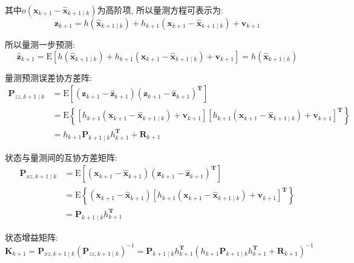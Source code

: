 \documentclass{article}
\begin{document}
其中$o\left(\mathbf{x}_{k+1}-\mathbf{\hat x}_{k+1 \mid k}\right)$为高阶项, 所以量测方程可表示为: 
\begin{equation*}
    \mathbf{z}_{k+1}=h\left(\hat{\mathbf{x}}_{k+1 \mid k}\right)+h_{k+1}\left(\mathbf{x}_{k+1}-\hat{\mathbf{x}}_{k+1 \mid k}\right)+\mathbf{v}_{k+1} 
\end{equation*}

所以量测一步预测:
\begin{equation*}
    \mathbf{\hat z}_{k+1}=\mathrm{E}\left[h\left(\hat{\mathbf{x}}_{k+1 \mid k}\right)+h_{k+1}\left(\mathbf{x}_{k+1}-\hat{\mathbf{x}}_{k+1 \mid k}\right)+\mathbf{v}_{k+1}\right]=h\left(\hat{\mathbf{x}}_{k+1 \mid k}\right)
\end{equation*}


量测预测误差协方差阵:
\begin{equation*}
    \begin{aligned}
    \mathbf{P}_{z z, k+1 \mid k} &=\mathrm{E}\left[\left(\mathbf{z}_{k+1}-\mathbf{\hat z}_{k+1}\right)\left(\mathbf{z}_{k+1}-\mathbf{\hat z}_{k+1}\right)^{\mathbf{T}}\right] \\
    &=\mathrm{E}\left\{\left[h_{k+1}\left(\mathbf{x}_{k+1}-\hat{\mathbf{x}}_{k+1 \mid k}\right)+\mathbf{v}_{k+1}\right]\left[h_{k+1}\left(\mathbf{x}_{k+1}-\hat{\mathbf{x}}_{k+1 \mid k}\right)+\mathbf{v}_{k+1}\right]^{\mathbf{T}}\right\} \\
    &=h_{k+1} \mathbf{P}_{k+1 \mid k} h_{k+1}^{\mathbf{T}}+\mathbf{R}_{k+1}
    \end{aligned}
\end{equation*}

状态与量测间的互协方差矩阵:
\begin{equation*}
    \begin{aligned}
    \mathbf{P}_{x z, k+1 \mid k} &=\mathrm{E}\left[\left(\mathbf{x}_{k+1}-\hat{\mathbf{x}}_{k+1}\right)\left(\mathbf{z}_{k+1}-\hat{\mathbf{z}}_{k+1}\right)^{\mathbf{T}}\right] \\
    &=\mathrm{E}\left\{\left(\mathbf{x}_{k+1}-\hat{\mathbf{x}}_{k+1}\right)\left[h_{k+1}\left(\mathbf{x}_{k+1}-\hat{\mathbf{x}}_{k+1 \mid k}\right)+\mathbf{v}_{k+1}\right]^{\mathbf{T}}\right\} \\
    &=\mathbf{P}_{k+1 \mid k} h_{k+1}^{\mathbf{T}}
    \end{aligned}
\end{equation*}

状态增益矩阵:
\begin{equation*}
    \mathbf{K}_{k+1}=\mathbf{P}_{x z, k+1 \mid k}\left(\mathbf{P}_{z z, k+1 \mid k}\right)^{-1}=\mathbf{P}_{k+1 \mid k} h_{k+1}^{\mathbf{T}}\left(h_{k+1} \mathbf{P}_{k+1 \mid k} h_{k+1}^{\mathbf{T}}+\mathbf{R}_{k+1}\right)^{-1}
\end{equation*}
     
\end{document}
